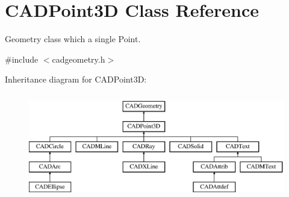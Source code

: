 \hypertarget{class_c_a_d_point3_d}{}\section{C\+A\+D\+Point3D Class Reference}
\label{class_c_a_d_point3_d}


Geometry class which a single Point.  




{\ttfamily \#include $<$cadgeometry.\+h$>$}

Inheritance diagram for C\+A\+D\+Point3D\+:\begin{figure}[H]
\begin{center}
\leavevmode
\includegraphics[height=4.620462cm]{class_c_a_d_point3_d}
\end{center}
\end{figure}
